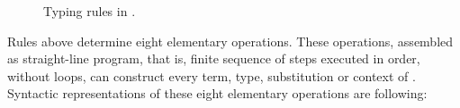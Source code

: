 \documentclass{article}%
\theoremstyle{remark}
\theoremstyle{definition}
\theoremstyle{definition}
\theoremstyle{plain}
\begin{document}
\begin{figure}[H]
  \par\bigskip

  \begin{prooftree}
  \end{prooftree}

  \par\medskip
  \caption{Typing rules in \catt.}
  \label{fig:typing}
\end{figure}

Rules above determine eight elementary operations. These operations, assembled
as straight-line program, that is, finite sequence of steps executed in order,
without loops, can construct every term, type, substitution or context of \catt.
Syntactic representations of these eight elementary operations are following:
\end{document}
